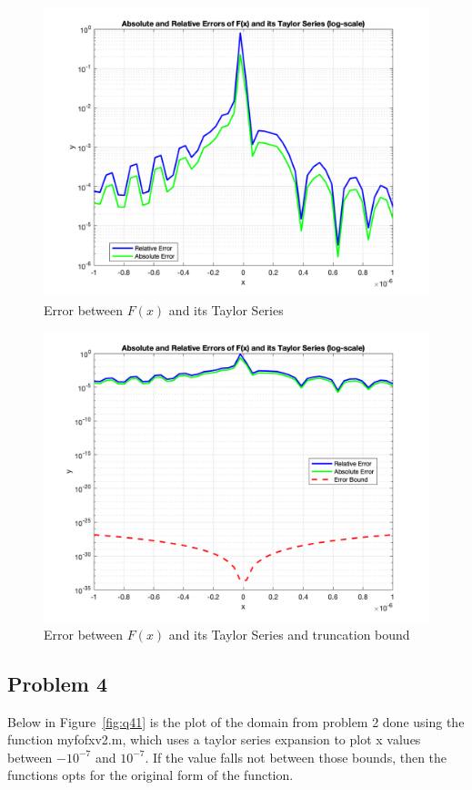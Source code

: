 \documentclass[11pt]{article}
\begin{document}
\begin{figure}[h!]
  \centering
  \includegraphics[width=0.8\linewidth]{lab1b_3_error.png}
  \caption{Error between $F(x)$ and its Taylor Series}
  \label{fig:lab1b_3_error}
\end{figure}

\begin{figure}[h!]
  \centering
  \includegraphics[width=0.8\linewidth]{lab1b_3_error_bound.png}
  \caption{Error between $F(x)$ and its Taylor Series and truncation bound}
  \label{fig:lab1b_3_error_bound}
\end{figure}

\subsection{Problem 4}
Below in Figure~\ref{fig:q41} is the plot of the domain from problem 2 done using the function myfofxv2.m, which uses a taylor series expansion
to plot x values between $-10^{-7}$ and $10^{-7}$. If the value falls not between those bounds, then the functions opts for the original form of the function.
\end{document}

